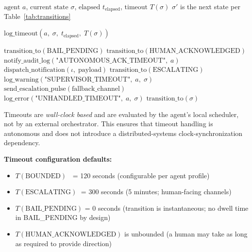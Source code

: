 \begin{algorithm}[H]
\caption{Timeout Handler}
\label{alg:timeout-handler}
\begin{algorithmic}[1]
\Require $\text{agent } a$, $\text{current state } \sigma$,
         $\text{elapsed } t_{\text{elapsed}}$, $\text{timeout } T(\sigma)$
\Ensure $\sigma'$ is the next state per Table~\ref{tab:transitions}

\State $\text{log\_timeout}(a,\; \sigma,\; t_{\text{elapsed}},\; T(\sigma))$

\Switch{$\sigma$}
    \State $\text{transition\_to}(\text{BAIL\_PENDING})$
  \EndCase
    \State $\text{transition\_to}(\text{HUMAN\_ACKNOWLEDGED})$
    \State $\text{notify\_audit\_log}(
           \text{"AUTONOMOUS\_ACK\_TIMEOUT"},\; a)$
  \EndCase
    \State $\text{dispatch\_notification}(\iota,\; \text{payload})$
    \State $\text{transition\_to}(\text{ESCALATING})$
  \EndCase
    \State $\text{log\_warning}(
           \text{"SUPERVISOR\_TIMEOUT"},\; a,\; \sigma)$
    \State $\text{send\_escalation\_pulse}(\text{fallback\_channel})$
  \EndCase
  \Default
    \State $\text{log\_error}(
           \text{"UNHANDLED\_TIMEOUT"},\; a,\; \sigma)$
    \State $\text{transition\_to}(\sigma)$
  \EndSwitch
\end{algorithmic}
\end{algorithm}

\bigskip
Timeouts are \emph{wall-clock based} and are evaluated by the agent's
local scheduler, not by an external orchestrator.  This ensures that
timeout handling is autonomous and does not introduce a distributed-systems
clock-synchronization dependency.

\bigskip
\noindent\textbf{Timeout configuration defaults:}

\begin{itemize}
  \item $T(\text{BOUNDED}) \;\;$    = 120 seconds (configurable per agent profile)
  \item $T(\text{ESCALATING}) \;$   = 300 seconds (5 minutes; human-facing channels)
  \item $T(\text{BAIL\_PENDING}) $  = 0 seconds (transition is instantaneous;
        no dwell time in BAIL\_PENDING by design)
  \item $T(\text{HUMAN\_ACKNOWLEDGED})$ is unbounded (a human may take
        as long as required to provide direction)
\end{itemize}

